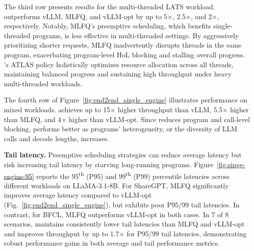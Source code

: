 The third row presents results for the multi-threaded LATS workload. \text{\name} outperforms vLLM, MLFQ, and vLLM-opt by up to 5×, 2.5×, and 2×, respectively. Notably, MLFQ’s preemptive scheduling, which benefits single-threaded programs, is less effective in multi-threaded settings. By aggressively prioritizing shorter requests, MLFQ inadvertently disrupts threads in the same program, exacerbating program-level HoL blocking and stalling overall progress. \text{\name}’s ATLAS policy holistically optimizes resource allocation across all threads, maintaining balanced progress and sustaining high throughput under heavy multi-threaded workloads.

The fourth row of Figure~\ref{fig:end2end_single_engine} illustrates performance on mixed workloads. \text{\name} achieves up to 15× higher throughput than vLLM, 5.5× higher than MLFQ, and 4× higher than vLLM-opt. Since \text{\name} reduces program and call-level blocking, \text{\name} performs better as programs' heterogeneity, or the diversity of LLM calls and decode lengths, increases. 



\vspace{1mm}
\noindent \textbf{Tail latency.}
Preemptive scheduling strategies can reduce average latency but risk increasing tail latency by starving long-running programs. Figure~\ref{fig:singe-engine-95} reports the 95\textsuperscript{th} (P95) and 99\textsuperscript{th} (P99) percentile latencies across different workloads on LLaMA-3.1-8B. For ShareGPT, MLFQ significantly improves average latency compared to vLLM-opt (Fig.~\ref{fig:end2end_single_engine}), but exhibits poor P95/99 tail latencies. In contrast, for BFCL, MLFQ outperforms vLLM-opt in both cases. In 7 of 8 scenarios, \text{\name} maintains consistently lower tail latencies than MLFQ and vLLM-opt and improves throughput by up to 1.7× for P95/99 tail latencies, demonstrating robust performance gains in both average and tail performance metrics.

 
